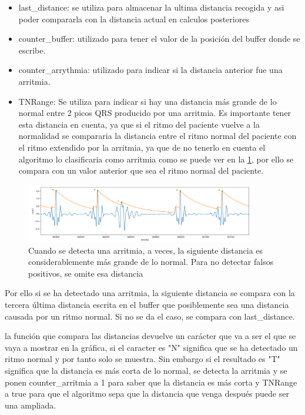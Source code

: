 \begin{itemize}
    \item last\_distance: se utiliza para almacenar la ultima distancia recogida y asi poder compararla con la distancia 
    actual en calculos posteriores
    \item counter\_buffer: utilizado para tener el valor de la posición del buffer donde se escribe.
    \item counter\_arrythmia: utilizado para indicar si la distancia anterior fue una arritmia.
    \item TNRange: Se utiliza para indicar si hay una distancia más grande de lo normal entre 2 picos QRS producido
    por una arritmia. Es importante tener esta distancia en cuenta, ya que si el ritmo del paciente vuelve a la
    normalidad se compararia la distancia entre el ritmo normal del paciente con el ritmo extendido por la arritmia,
    ya que de no tenerlo en cuenta el algoritmo lo clasificaria como arritmia como se puede ver en la \cref{fig:senial_explicacion_TNRANGE}, por ello se compara con un valor anterior
    que sea el ritmo normal del paciente.
\end{itemize}

\begin{figure}[h!]
    \centering
    \includegraphics[width=0.9\textwidth]{./Images/img_algoritmo/senial_explicacion_TNRANGE.png}
    \caption{Cuando se detecta una arritmia, a veces, la siguiente distancia es considerablemente más grande de lo normal. Para no detectar falsos positivos, se omite esa distancia}
    \label{fig:senial_explicacion_TNRANGE}
\end{figure}

Por ello si se ha detectado una arritmia, la siguiente distancia se compara con
la tercera última distancia escrita en el buffer que posiblemente sea una distancia causada por un ritmo normal. 
Si no se da el caso, se compara con last\_distance.

la función que compara las distancias devuelve un carácter que va a ser el que se vaya a mostrar en la gráfica, 
si el caracter es "N" significa que se ha detectado un ritmo normal y por tanto solo se muestra. Sin embargo si el 
resultado es "T" significa que la distancia es más corta de lo normal, se detecta la arritmia y se ponen
counter\_arritmia a 1 para saber que la distancia es más corta y TNRange a true para que el algoritmo sepa 
que la distancia que venga después puede ser una ampliada. 

